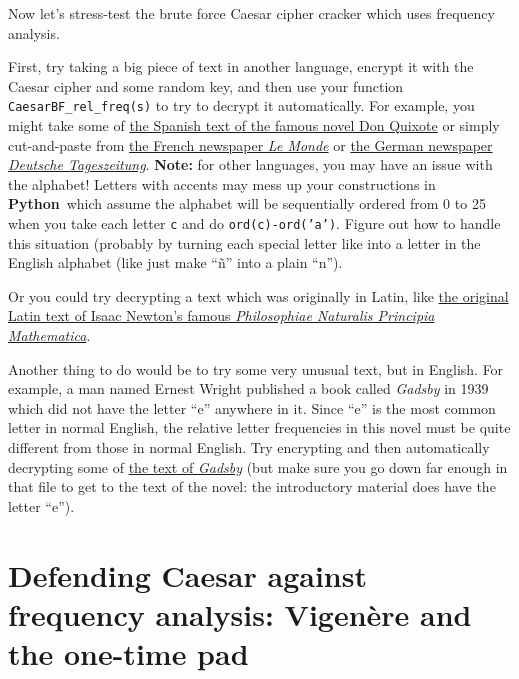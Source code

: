 \documentclass[12pt,letterpaper]{amsbook}
\theoremstyle{definition}
\theoremstyle{remark}
\numberwithin{figure}{section}
\numberwithin{exercise}{chapter}
\numberwithin{section}{chapter}
\numberwithin{equation}{section}
\numberwithin{table}{subsection}
\newcommand{\code}[1]{\colorbox{lg}{\texttt{#1}}}
\newcommand{\Python}{{\textbf{\ix{Python}}}}
\newcommand{\blue}[1]{{\color{blue}#1}}
\newcommand{\bhref}[2]{{\href{#1}{\blue{#2}}}}
\newcommand{\ix}[1]{{#1}\index{#1}}
\begin{document}
\vskip4mm
\begin{BTtcb}[label=bt:stresstestCaesarBF_rel_freqs]{}{}
  Now let's stress-test the brute force Caesar cipher
  cracker which uses frequency analysis.

  \vskip2mm
  First, try taking a big piece of text in another language, encrypt it
  with the Caesar cipher and some random key, and then use your function
  \code{CaesarBF\_rel\_freq(s)} to try to decrypt it automatically.  For
  example, you might take some of \bhref{https://www.gutenberg.org/files/2000/2000-0.txt}{the Spanish text of the famous novel Don Quixote} or simply
  cut-and-paste from
  \bhref{https://www.lemonde.fr/}{the French newspaper \textit{Le Monde}} or
  \bhref{https://www.deutschetageszeitung.de/}{the German newspaper \textit{Deutsche Tageszeitung}}.  \textbf{Note:} for other languages, you may have an issue
  with the alphabet!  Letters with accents may mess up your constructions in
  \Python\ which assume the alphabet will be sequentially ordered from 0 to 25
  when you take each letter \code{c} and do \code{ord(c)-ord('a')}.
  Figure out how to handle this situation (probably by turning each special
  letter like into a letter in the English alphabet (like just make  ``\~{n}''
  into a plain ``n'').

  \vskip2mm
  Or you could try decrypting a text which was originally in Latin, like
  \bhref{https://www.gutenberg.org/cache/epub/28233/pg28233.txt}{the original
  Latin text of Isaac Newton's famous \textit{Philosophiae Naturalis Principia}}
  \bhref{https://www.gutenberg.org/cache/epub/28233/pg28233.txt}{\textit{Mathematica}}.

  \vskip2mm
  Another thing to do would be to try some very unusual text, but in English.
  For example, a man named Ernest Wright published a book called \textit{Gadsby}
  in 1939 which did not have the letter ``e'' anywhere in it.  Since ``e'' is
  the most common letter in normal English, the relative letter frequencies in
  this novel must be quite different from those in normal English.  Try
  encrypting and then automatically decrypting some of \bhref{https://www.gutenberg.org/cache/epub/47342/pg47342.txt}{the text of
  \textit{Gadsby}} (but make sure you go down far enough in that file to get
  to the text of the novel: the introductory material does have the letter
  ``e'').
\end{BTtcb}

\vfill
\pagebreak
\section{Defending Caesar against frequency analysis: Vigen\`ere
and the one-time pad}
\label{sec:DCafaVatotp}
\end{document}
